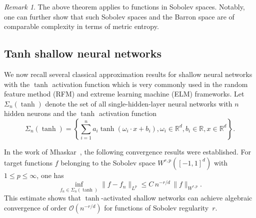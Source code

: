 \documentclass{article}
\theoremstyle{remark}
\newtheorem{remark}{Remark}
\begin{document}
\begin{remark}
    The above theorem applies to functions in Sobolev spaces. Notably, one can further show that such Sobolev spaces and the Barron space are of comparable complexity in terms of metric entropy.
\end{remark}


\subsection{Tanh shallow neural networks}
\label{sec:tanh_theory}

We now recall several classical approximation results for shallow neural networks
with the $\tanh$ activation function which is very commonly used in 
the random feature method (RFM) and extreme learning machine (ELM) frameworks. 
Let $\Sigma_n(\tanh)$ denote the set of all single-hidden-layer neural networks
with $n$ hidden neurons and the $\tanh$ activation function
\begin{equation}
    \Sigma_n(\tanh) = \left\{ \sum_{i = 1 }^n a_i \tanh(\omega_i \cdot x + b_i), \omega_i \in \mathbb{R}^d, b_i \in \mathbb{R}, x \in \mathbb{R}^d \right\}.  
\end{equation}

\medskip
\noindent
In the work of Mhaskar~\cite{mhaskar1996neural}, 
the following convergence results were established.
For target functions $f$ belonging to the Sobolev space
$W^{r,p}([-1,1]^d)$ with $1 \leq p \leq \infty$, one has
\begin{equation}
\label{eq:tanh_poly_rate}
\inf_{f_n \in \Sigma_n(\tanh)} 
\|f - f_n\|_{L^p} 
\leq C\, n^{-r/d}\, \|f\|_{W^{r,p}}.
\end{equation}
This estimate shows that $\tanh$-activated shallow networks can achieve
algebraic convergence of order $\mathcal{O}(n^{-r/d})$ for functions of Sobolev regularity~$r$.

\end{document}
